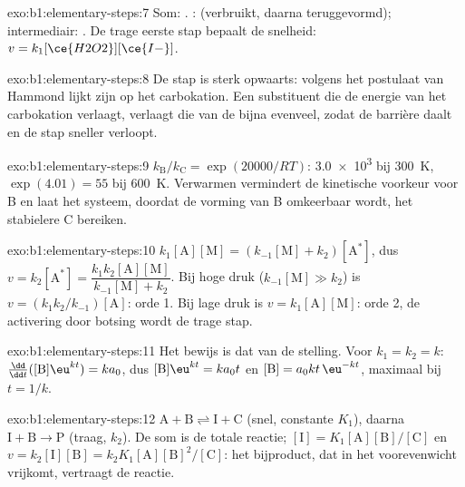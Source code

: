 \begin{solution}{exo:b1:elementary-steps:7}
Som: . :  (verbruikt, daarna
teruggevormd); intermediair: . De trage eerste stap bepaalt de
snelheid: $v = k_1[\ce{H2O2}][\ce{I-}]$.
\end{solution}

\begin{solution}{exo:b1:elementary-steps:8}
De stap is sterk opwaarts: volgens het postulaat van Hammond lijkt zijn
 op het carbokation. Een substituent die de energie van
het carbokation verlaagt, verlaagt die van de  bijna
evenveel, zodat de barrière daalt en de stap sneller verloopt.
\end{solution}

\begin{solution}{exo:b1:elementary-steps:9}
$k_{\mathrm B}/k_{\mathrm C} = \exp(20000/RT)$: \num{3.0e3} bij \qty{300}{K},
$\exp(4.01) = 55$ bij \qty{600}{K}. Verwarmen vermindert de kinetische
voorkeur voor B en laat het systeem, doordat de vorming van B omkeerbaar
wordt, het stabielere C bereiken.
\end{solution}

\begin{solution}{exo:b1:elementary-steps:10}
$k_1[\mathrm{A}][\mathrm{M}] = (k_{-1}[\mathrm{M}] + k_2)[\mathrm{A}^*]$,
dus $v = k_2[\mathrm{A}^*] = \dfrac{k_1k_2[\mathrm{A}][\mathrm{M}]}{k_{-1}[\mathrm{M}]
+ k_2}$. Bij hoge druk ($k_{-1}[\mathrm{M}] \gg k_2$) is $v =
(k_1k_2/k_{-1})[\mathrm{A}]$: orde 1. Bij lage druk is $v =
k_1[\mathrm{A}][\mathrm{M}]$: orde 2, de activering door botsing wordt de
trage stap.
\end{solution}

\begin{solution}{exo:b1:elementary-steps:11}
Het bewijs is dat van de stelling. Voor $k_1 = k_2 = k$:
$\frac{\dd}{\dd t}([\mathrm{B}]\eu^{kt}) = ka_0$, dus $[\mathrm{B}]\eu^{kt} =
ka_0t$ en $[\mathrm{B}] = a_0kt\,\eu^{-kt}$, maximaal bij $t = 1/k$.
\end{solution}

\begin{solution}{exo:b1:elementary-steps:12}
$\mathrm{A} + \mathrm{B} \rightleftharpoons \mathrm{I} + \mathrm{C}$ (snel,
constante $K_1$), daarna $\mathrm{I} + \mathrm{B} \to \mathrm{P}$ (traag,
$k_2$). De som is de totale reactie; $[\mathrm{I}] =
K_1[\mathrm{A}][\mathrm{B}]/[\mathrm{C}]$ en $v = k_2[\mathrm{I}][\mathrm{B}]
= k_2K_1[\mathrm{A}][\mathrm{B}]^2/[\mathrm{C}]$: het bijproduct, dat in het
voorevenwicht vrijkomt, vertraagt de reactie.
\end{solution}

